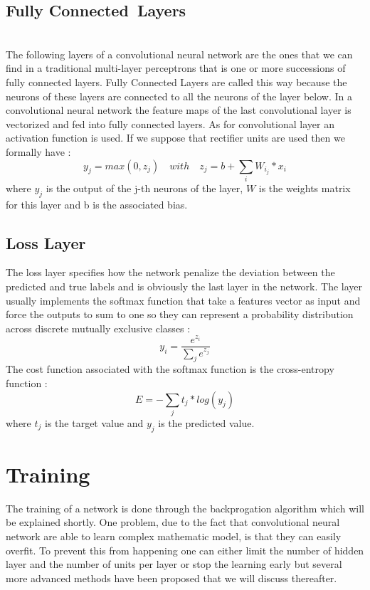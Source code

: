     \subsection{Fully Connected Layers} \\

    The following layers of a convolutional neural network are the ones that we can find in a traditional multi-layer perceptrons that is one or more successions of fully connected layers. Fully Connected Layers are called this way because the neurons of these layers are connected to all the neurons of the layer below. In a convolutional neural network the feature maps of the last convolutional layer is vectorized and fed into fully connected layers. As for convolutional layer an activation function is used. If we suppose that rectifier units are used then we formally have : \[ y_j = max(0, z_j) \quad with \quad z_j = b + \sum_{i} W_i_j * x_i \] where \( y_j \) is the output of the j-th neurons of the layer, \( W \) is the weights matrix for this layer and b is the associated bias.
    \\

    \subsection{Loss Layer}

    The loss layer specifies how the network penalize the deviation between the predicted and true labels and is obviously the last layer in the network. The layer usually implements the softmax function that take a features vector as input and force the outputs to sum to one so they can represent a probability distribution across discrete mutually exclusive classes : \[ y_i = \dfrac{e^{z_i}}{\sum_{j} e^{z_j}} \]
    The cost function associated with the softmax function is the cross-entropy function : \[ E = -\sum_{j} t_j*log(y_j) \] where \( t_j \) is the target value and \( y_j \) is the predicted value.

  \section{Training}

  The training of a network is done through the backprogation algorithm which will be explained shortly. One problem, due to the fact that convolutional neural network are able to learn complex mathematic model, is that they can easily overfit. To prevent this from happening one can either limit the number of hidden layer and the number of units per layer or stop the learning early but several more advanced methods have been proposed that we will discuss thereafter.

